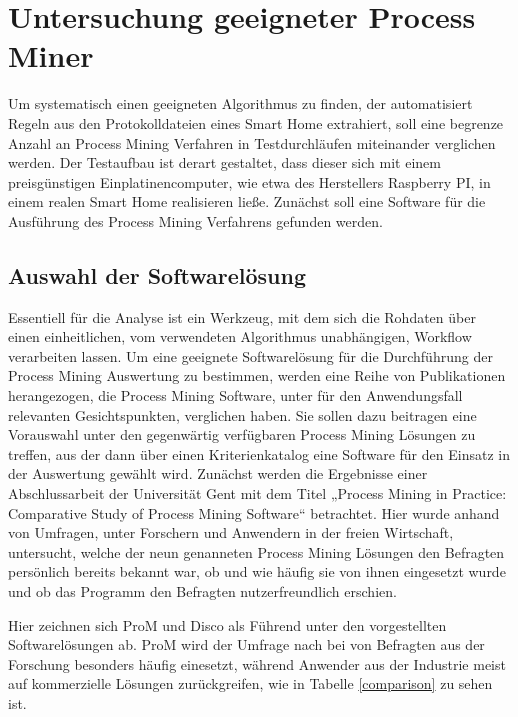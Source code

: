 \chapter{Untersuchung geeigneter Process Miner}\label{chap:approach}
Um systematisch einen geeigneten Algorithmus zu finden, der automatisiert Regeln aus den Protokolldateien eines Smart Home extrahiert, soll eine begrenze Anzahl an Process Mining Verfahren in Testdurchläufen miteinander verglichen werden. Der Testaufbau ist derart gestaltet, dass dieser sich mit einem preisgünstigen Einplatinencomputer, wie etwa des Herstellers Raspberry PI, in einem realen Smart Home realisieren ließe. Zunächst soll eine Software für die Ausführung des Process Mining Verfahrens gefunden werden.

\section{Auswahl der Softwarelösung}
Essentiell für die Analyse ist ein Werkzeug, mit dem sich die Rohdaten über einen einheitlichen, vom verwendeten Algorithmus unabhängigen, Workflow verarbeiten lassen. Um eine geeignete Softwarelösung für die Durchführung der Process Mining Auswertung zu bestimmen, werden eine Reihe von Publikationen herangezogen, die  Process Mining Software, unter für den Anwendungsfall relevanten Gesichtspunkten, verglichen haben. Sie sollen dazu beitragen eine Vorauswahl unter den gegenwärtig verfügbaren Process Mining Lösungen zu treffen, aus der dann über einen Kriterienkatalog eine Software für den Einsatz in der Auswertung gewählt wird. 
Zunächst werden die Ergebnisse einer Abschlussarbeit der Universität Gent mit dem Titel „Process Mining in Practice: Comparative Study of Process Mining Software“ \cite{verstraete} betrachtet. Hier wurde anhand von Umfragen, unter Forschern und Anwendern in der freien Wirtschaft, untersucht, welche der neun genanneten Process Mining Lösungen den Befragten persönlich bereits bekannt war, ob und wie häufig sie von ihnen eingesetzt wurde und ob das Programm den Befragten nutzerfreundlich erschien.

Hier zeichnen sich ProM und Disco als Führend unter den vorgestellten Softwarelösungen ab. ProM wird der Umfrage nach bei von Befragten aus der Forschung besonders häufig einesetzt, während Anwender aus der Industrie meist auf kommerzielle Lösungen zurückgreifen, wie in Tabelle \ref{comparison} zu sehen ist.

